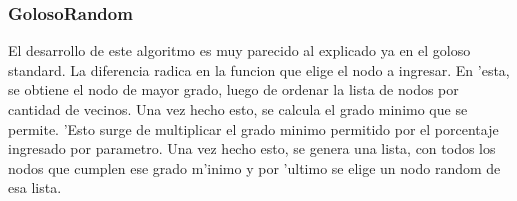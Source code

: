 \subsubsection{GolosoRandom}
El desarrollo de este algoritmo es muy parecido al explicado ya en el goloso standard. La diferencia radica en la funcion que elige el nodo a ingresar. En 'esta, se obtiene el nodo de mayor grado, luego de ordenar la lista de nodos por cantidad de vecinos. Una vez hecho esto, se calcula el grado minimo que se permite. 'Esto surge de multiplicar el grado minimo permitido por el porcentaje ingresado por parametro. Una vez hecho esto, se genera una lista, con todos los nodos que cumplen ese grado m'inimo y por 'ultimo se elige un nodo random de esa lista.
